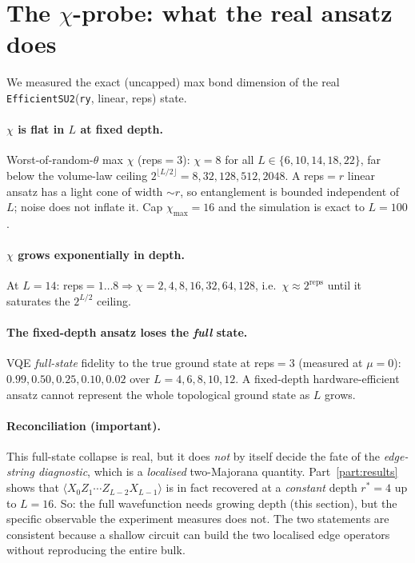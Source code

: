 \documentclass[11pt]{article}
\newcommand{\Oedge}{X_0 Z_1\cdots Z_{L-2} X_{L-1}}
\newcommand{\expv}[1]{\langle #1\rangle}
\newcommand{\chimax}{\chi_{\max}}
\newcommand{\code}[1]{\texttt{#1}}
\begin{document}
\section{The $\chi$-probe: what the real ansatz does}\label{sec:chi}
We measured the exact (uncapped) max bond dimension of the real
\code{EfficientSU2}(\code{ry}, linear, reps) state.

\paragraph{$\chi$ is flat in $L$ at fixed depth.}
Worst-of-random-$\theta$ max $\chi$ (reps${}=3$): $\chi=8$ for all
$L\in\{6,10,14,18,22\}$, far below the volume-law ceiling
$2^{\lfloor L/2\rfloor}=8,32,128,512,2048$. A reps${}=r$ linear ansatz has a
light cone of width ${\sim}r$, so entanglement is bounded independent of $L$;
noise does not inflate it. Cap $\chimax=16$ and the simulation is exact to
$L=100$.

\paragraph{$\chi$ grows exponentially in depth.}
At $L=14$: reps${}=1\ldots8\Rightarrow\chi=2,4,8,16,32,64,128$, i.e.\
$\chi\approx 2^{\text{reps}}$ until it saturates the $2^{L/2}$ ceiling.

\paragraph{The fixed-depth ansatz loses the \emph{full} state.}
VQE \emph{full-state} fidelity to the true ground state at reps${}=3$
(measured at $\mu=0$): $0.99,0.50,0.25,0.10,0.02$ over $L=4,6,8,10,12$.
A fixed-depth hardware-efficient ansatz cannot represent the whole topological
ground state as $L$ grows.

\paragraph{Reconciliation (important).} This full-state collapse is real, but it
does \emph{not} by itself decide the fate of the \emph{edge-string diagnostic},
which is a \emph{localised} two-Majorana quantity. Part~\ref{part:results} shows
that $\expv{\Oedge}$ is in fact recovered at a \emph{constant} depth
$r^\ast=4$ up to $L=16$. So: the full wavefunction needs growing depth (this
section), but the specific observable the experiment measures does not. The two
statements are consistent because a shallow circuit can build the two localised
edge operators without reproducing the entire bulk.
\end{document}
